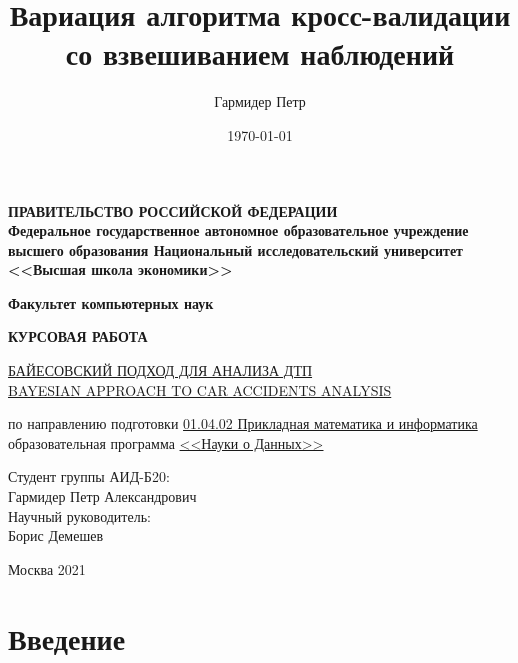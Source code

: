 \documentclass[a4paper, 14pt]{article}
\title{Вариация алгоритма кросс-валидации со взвешиванием наблюдений}
\author{Гармидер Петр}
\date{\today}
\begin{document}
\thispagestyle{empty}
\begin{center}
	\textbf{ПРАВИТЕЛЬСТВО РОССИЙСКОЙ ФЕДЕРАЦИИ}\\
	\vspace{2ex}
	\textbf{Федеральное государственное автономное образовательное учреждение \\ высшего образования Национальный исследовательский университет \\ <<Высшая школа экономики>>}
	
	
	\vspace{8ex}
	
	\textbf{Факультет компьютерных наук}
\end{center}
\vspace{9ex}

\begin{center}
	{\textbf{КУРСОВАЯ РАБОТА
	}}
	\vspace{1ex}
	
	\underline{БАЙЕСОВСКИЙ ПОДХОД ДЛЯ АНАЛИЗА ДТП} \\
	\underline{BAYESIAN APPROACH TO CAR ACCIDENTS ANALYSIS}\\
	\vspace{1.5ex}
	
	по направлению подготовки \underline{01.04.02 Прикладная математика и информатика} \\
	образовательная программа \underline{<<Науки о Данных>>}
	
\end{center}
\vspace{1ex}
\begin{flushright}
	\noindent
	Студент группы АИД-Б20:\\Гармидер Петр Александрович\\
	\vspace{13ex}
	Научный руководитель:\\
	Борис Демешев
	
\end{flushright}	

\vfill

\begin{center}
	Москва 2021
	
\end{center}
\newpage

\tableofcontents

\newpage

\section{Введение}
\end{document}
